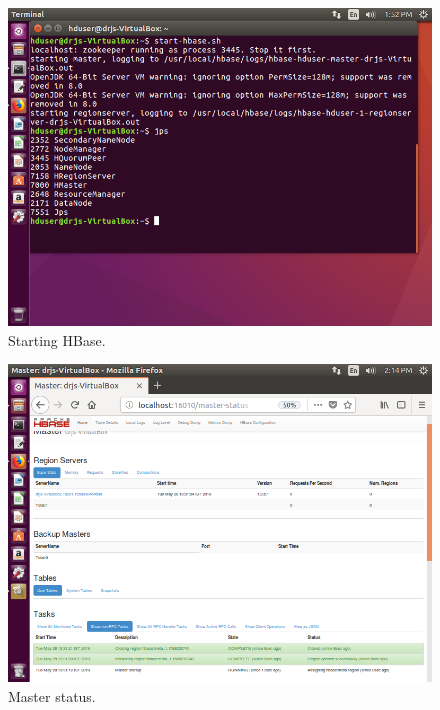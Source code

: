 \documentclass[a4paper,10pt]{article}
\begin{document}
\begin{figure}[h]
	\includegraphics[scale=0.33,center]{10.png}
	\caption{Starting HBase.}
	\label{fig:11}
\end{figure}

\begin{figure}[h]
	\includegraphics[scale=0.33,center]{19.png}
	\caption{Master status.}
	\label{fig:12}
\end{figure}
\end{document}

